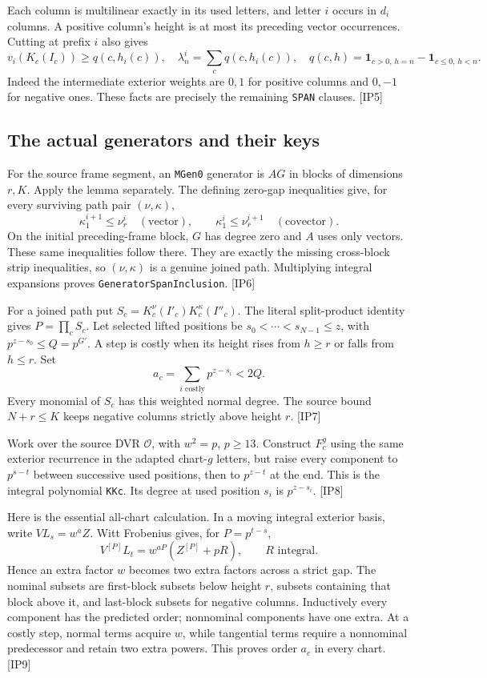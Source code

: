 Each column is multilinear exactly in its used letters, and letter $i$ occurs in $d_i$ columns. A positive column's height is at most its preceding vector occurrences. Cutting at prefix $i$ also gives
\[
 v_i(K_c(I_c))\ge q(c,h_i(c)),\quad
 \lambda^i_n=\sum_cq(c,h_i(c)),\quad
 q(c,h)=\mathbf1_{c>0,\,h=n}-\mathbf1_{c\le0,\,h<n}.
 \tag{IP.3}
\]
Indeed the intermediate exterior weights are $0,1$ for positive columns and $0,-1$ for negative ones. These facts are precisely the remaining \texttt{SPAN} clauses. \textsf{[IP5]}

\subsection{The actual generators and their keys}

For the source frame segment, an \texttt{MGen0} generator is $AG$ in blocks of dimensions $r,K$. Apply the lemma separately. The defining zero-gap inequalities give, for every surviving path pair $(\nu,\kappa)$,
\[
 \kappa^{i+1}_1\le\nu^i_r\quad(\text{vector}),\qquad
 \kappa^i_1\le\nu^{i+1}_r\quad(\text{covector}).
\]
On the initial preceding-frame block, $G$ has degree zero and $A$ uses only vectors. These same inequalities follow there. They are exactly the missing cross-block strip inequalities, so $(\nu,\kappa)$ is a genuine joined path. Multiplying integral expansions proves \texttt{GeneratorSpanInclusion}. \textsf{[IP6]}

For a joined path put $S_c=K_c^{\nu}(I'_c)K_c^{\kappa}(I''_c)$. The literal split-product identity gives $P=\prod_cS_c$. Let selected lifted positions be $s_0<\cdots<s_{N-1}\le z$, with $p^{z-s_0}\le Q=p^{G'}$. A step is costly when its height rises from $h\ge r$ or falls from $h\le r$. Set
\[
 a_c=\sum_{i\text{ costly}}p^{z-s_i}<2Q.
 \tag{IP.4}
\]
Every monomial of $S_c$ has this weighted normal degree. The source bound $N+r\le K$ keeps negative columns strictly above height $r$. \textsf{[IP7]}

Work over the source DVR $\mathcal O$, with $w^2=p$, $p\ge13$. Construct $F_c^g$ using the same exterior recurrence in the adapted chart-$g$ letters, but raise every component to $p^{s-t}$ between successive used positions, then to $p^{z-t}$ at the end. This is the integral polynomial \texttt{KKc}. Its degree at used position $s_i$ is $p^{z-s_i}$. \textsf{[IP8]}

Here is the essential all-chart calculation. In a moving integral exterior basis, write $VL_s=w^aZ$. Witt Frobenius gives, for $P=p^{t-s}$,
\[
 V^{[P]}L_t=w^{aP}(Z^{[P]}+pR),\qquad R\text{ integral}.
 \tag{IP.5}
\]
Hence an extra factor $w$ becomes two extra factors across a strict gap. The nominal subsets are first-block subsets below height $r$, subsets containing that block above it, and last-block subsets for negative columns. Inductively every component has the predicted order; nonnominal components have one extra. At a costly step, normal terms acquire $w$, while tangential terms require a nonnominal predecessor and retain two extra powers. This proves order $a_c$ in every chart. \textsf{[IP9]}

